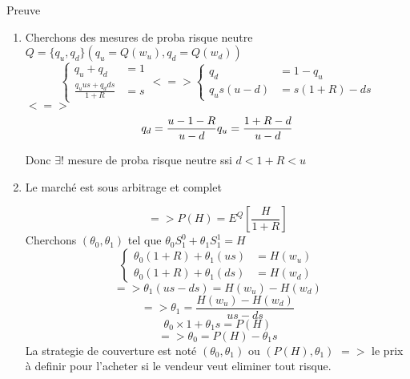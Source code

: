 \documentclass{article}
\begin{document}
Preuve
\begin{enumerate}
\item Cherchons des mesures de proba risque neutre $Q=\{q_u,q_d\}(q_u=Q(w_u),q_d=Q(w_d))$
\begin{equation}
\left\{ \begin{array}{rcl}
q_u+q_d&=1\\
\frac{q_uus+q_d ds}{1+R}&=s
\end{array}\right. <=>
\left\{\begin{array}{rcl}
q_d&=1-q_u\\
q_us(u-d)&=s(1+R)-ds
\end{array}\right.
\end{equation}
$<=>$
\begin{equation}
q_d=\frac{u-1-R}{u-d}\\
q_u=\frac{1+R-d}{u-d}
\end{equation}

Donc $\exists !$ mesure de proba risque neutre ssi $d<1+R<u$

\item Le march\'e est sous arbitrage et complet

\begin{equation}
=>P(H)=E^Q[\frac{H}{1+R}]
\end{equation}
Cherchons $(\theta_0,\theta_1)$ tel que $\theta_0S_1^0 + \theta_1S_1^1=H$
\begin{equation}
\left\{\begin{array}{rcl}
\theta_0(1+R)+\theta_1(us)&=H(w_u)\\
\theta_0(1+R)+\theta_1(ds)&=H(w_d)
\end{array}\right.
\end{equation}
\begin{equation}
=>\theta_1(us-ds)=H(w_u)-H(w_d)
\end{equation}
\begin{equation}
=>\theta_1=\frac{H(w_u)-H(w_d)}{us-ds}
\end{equation}
\begin{equation}
\theta_0\times 1+\theta_1 s=P(H)
\end{equation}
\begin{equation}
=>\theta_0=P(H)-\theta_1 s
\end{equation}
La strategie de couverture est not\'e $(\theta_0,\theta_1)$ ou $(P(H),\theta_1)$
$=>$ le prix \`a definir pour l'acheter si le vendeur veut eliminer tout risque.
\end{enumerate}
\end{document}

